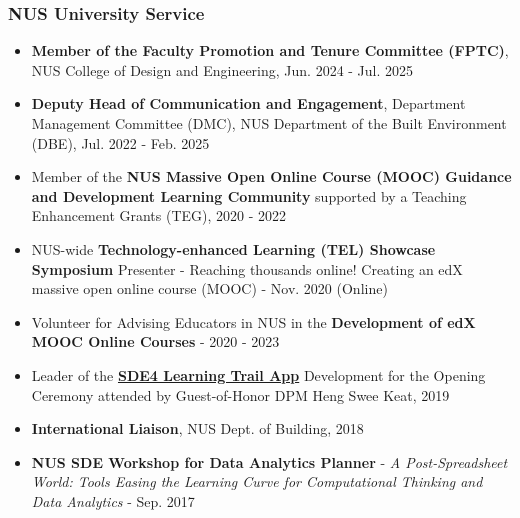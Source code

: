 \documentclass[10pt,a4paper]{article}
\begin{document}
\begin{small}
\subsubsection*{NUS University Service}

\begin{itemize}
\item
\textbf{Member of the Faculty Promotion and Tenure Committee (FPTC)}, NUS College of Design and Engineering, Jun. 2024 - Jul. 2025
\item
\textbf{Deputy Head of Communication and Engagement}, Department Management Committee (DMC), NUS Department of the Built Environment (DBE), Jul. 2022 - Feb. 2025
\item
Member of the \textbf{NUS Massive Open Online Course (MOOC) Guidance and Development Learning Community} supported by a Teaching Enhancement Grants (TEG), 2020 - 2022
\item
NUS-wide \textbf{Technology-enhanced Learning (TEL) Showcase Symposium} Presenter - Reaching thousands online! Creating an edX massive open online course (MOOC) - Nov. 2020 (Online)
\item
Volunteer for Advising Educators in NUS in the \textbf{Development of edX MOOC Online Courses}  - 2020 - 2023
\item
Leader of the \textbf{\href{https://www.facebook.com/nus.singapore/photos/minister-heng-swee-keat-exploring-the-new-sde-learning-trail-at-the-sde4-south-g/10156946075423540/?paipv=0&eav=AfbGSJ-Ss_QERF57zlowLItK8cMqvQC7A60JtjpwgjSna_qOjxB4__I_E2lcknmGvJ4&_rdr}{SDE4 Learning Trail App}} Development for the Opening Ceremony attended by Guest-of-Honor DPM Heng Swee Keat, 2019
\item
\textbf{International Liaison}, NUS Dept. of Building, 2018
\item 
\textbf{NUS SDE Workshop for Data Analytics Planner} - \emph{A Post-Spreadsheet World: Tools Easing the Learning Curve for Computational Thinking and Data Analytics} - Sep. 2017
\end{itemize}




\end{small}
\end{document}
